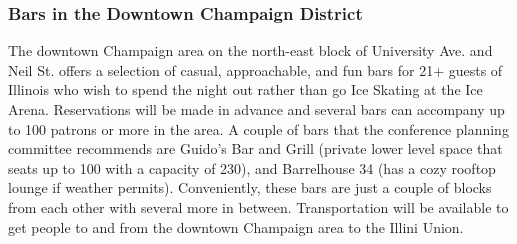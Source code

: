 
\subsubsection{Bars in the Downtown Champaign District} 
The downtown Champaign area on the north-east block of University Ave. and Neil St. offers a selection of casual, approachable, and fun bars for 21+ guests of Illinois who wish to spend the night out rather than go Ice Skating at the Ice Arena. Reservations will be made in advance and several bars can accompany up to 100 patrons or more in the area. A couple of bars that the conference planning committee recommends are Guido's Bar and Grill (private lower level space that seats up to 100 with a capacity of 230), and Barrelhouse 34 (has a cozy rooftop lounge if weather permits). Conveniently, these bars are just a couple of blocks from each other with several more in between. Transportation will be available to get people to and from the downtown Champaign area to the Illini Union.
\vspace{0.5cm}\newline

